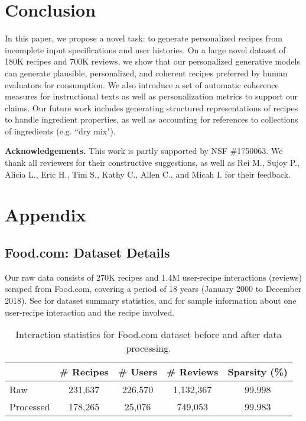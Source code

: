 \documentclass[11pt,a4paper]{article}
\begin{document}
\section{Conclusion}
In this paper, we propose a novel task: to generate personalized recipes from incomplete input specifications and user histories.
On a large novel dataset of 180K recipes and 700K reviews, we show that our personalized generative models can generate plausible, personalized, and coherent recipes preferred by human evaluators for consumption.
We also introduce a set of automatic coherence measures for instructional texts as well as personalization metrics to support our claims.
Our future work includes generating structured representations of recipes to handle ingredient properties, as well as accounting for references to collections of ingredients (e.g. ``dry mix").
\medskip


\noindent\textbf{Acknowledgements.}
This work is partly supported by NSF \#1750063.
We thank all reviewers for their constructive suggestions, as well as Rei M., Sujoy P., Alicia L., Eric H., Tim S., Kathy C., Allen C., and Micah I. for their feedback.





\clearpage

\section*{Appendix}

\subsection*{Food.com: Dataset Details}
Our raw data consists of 270K recipes and 1.4M user-recipe interactions (reviews) scraped from Food.com, covering a period of 18 years (January 2000 to December 2018).
See  for dataset summary statistics, and  for sample information about one user-recipe interaction and the recipe involved.

\begin{table}[h!]
\small
\centering
\begin{tabular}{@{}lcccc@{}}
\toprule
          & \# Recipes & \# Users & \# Reviews & Sparsity (\%) \\ \midrule
Raw       & 231,637    & 226,570  & 1,132,367  & 99.998        \\
Processed & 178,265    & 25,076   & 749,053    & 99.983        \\ \bottomrule
\end{tabular}
\caption{Interaction statistics for Food.com dataset before and after data processing.}
\label{tab:int-stats}
\end{table}
\end{document}
